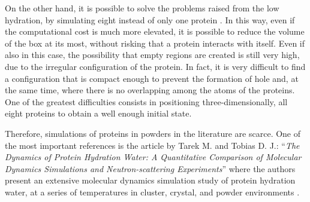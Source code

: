 On the other hand, it is possible to solve the problems raised from the low hydration, by simulating eight instead of only one protein \cite{tarek2000dynamics}. In this way, even if the computational cost is much more elevated, it is possible to reduce the volume of the box at its most, without risking that a protein interacts with itself. Even if also in this case, the possibility that empty regions are created is still very high, due to the irregular configuration of the protein. In fact, it is very difficult to find a configuration that is compact enough to prevent the formation of hole and, at the same time, where there is no overlapping among the atoms of the proteins. One of the greatest difficulties consists in positioning three-dimensionally, all eight proteins to obtain a well enough initial state.


Therefore, simulations of proteins in powders in the literature are scarce. One of the most important references is the article by Tarek M. and Tobias D. J.: ``\textit{The Dynamics of Protein Hydration Water: A Quantitative Comparison of Molecular Dynamics Simulations and Neutron-scattering Experiments}'' where the authors present an extensive molecular dynamics simulation study of protein hydration water, at a series of temperatures in cluster, crystal, and powder environments \cite{tarek2000dynamics}.

